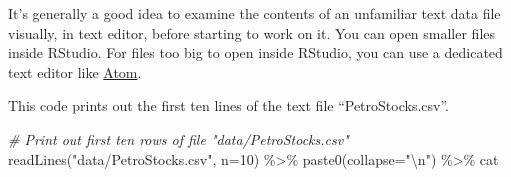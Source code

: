 \documentclass[
]{book}
\newenvironment{Shaded}{\begin{snugshade}}{\end{snugshade}}
\newcommand{\AttributeTok}[1]{\textcolor[rgb]{0.77,0.63,0.00}{#1}}
\newcommand{\CommentTok}[1]{\textcolor[rgb]{0.56,0.35,0.01}{\textit{#1}}}
\newcommand{\DecValTok}[1]{\textcolor[rgb]{0.00,0.00,0.81}{#1}}
\newcommand{\FunctionTok}[1]{\textcolor[rgb]{0.00,0.00,0.00}{#1}}
\newcommand{\NormalTok}[1]{#1}
\newcommand{\SpecialCharTok}[1]{\textcolor[rgb]{0.00,0.00,0.00}{#1}}
\newcommand{\StringTok}[1]{\textcolor[rgb]{0.31,0.60,0.02}{#1}}
\begin{document}
It's generally a good idea to examine the contents of an unfamiliar text data file visually, in text editor, before starting to work on it. You can open smaller files inside RStudio. For files too big to open inside RStudio, you can use a dedicated text editor like \href{https://atom.io/}{Atom}.

This code prints out the first ten lines of the text file ``PetroStocks.csv''.

\begin{Shaded}
\begin{Highlighting}[]
\CommentTok{\# Print out first ten rows of file "data/PetroStocks.csv"}
\FunctionTok{readLines}\NormalTok{(}\StringTok{"data/PetroStocks.csv"}\NormalTok{, }\AttributeTok{n=}\DecValTok{10}\NormalTok{) }\SpecialCharTok{\%\textgreater{}\%} \FunctionTok{paste0}\NormalTok{(}\AttributeTok{collapse=}\StringTok{"}\SpecialCharTok{\textbackslash{}n}\StringTok{"}\NormalTok{) }\SpecialCharTok{\%\textgreater{}\%}\NormalTok{ cat}
\end{Highlighting}
\end{Shaded}
\end{document}
